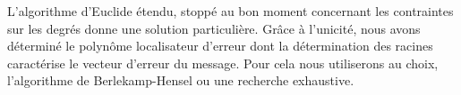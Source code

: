 \documentclass{article}
\begin{document}
		L'algorithme d'Euclide étendu, stoppé au bon moment concernant les contraintes sur les degrés donne une solution particulière.
		Grâce à l'unicité, nous avons déterminé le polynôme localisateur d'erreur dont la détermination des racines caractérise le vecteur d'erreur du message.
		Pour cela nous utiliserons au choix, l'algorithme de Berlekamp-Hensel ou une recherche exhaustive.





\end{document}
